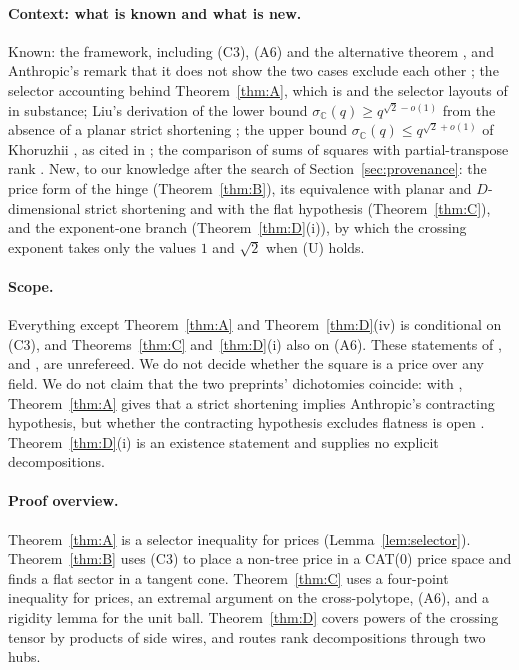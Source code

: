 \documentclass[11pt,a4paper]{article}
\theoremstyle{definition}
\newcommand{\C}{\mathbb{C}}
\newcommand{\CS}{\textup{C3}}
\newcommand{\AS}{\textup{A6}}
\begin{document}
\paragraph{Context: what is known and what is new.} Known: the framework,
including (\CS), (\AS) and the alternative theorem \cite[Thm.~D.2]{Ant}, and
Anthropic's remark that it does not show the two cases exclude each other
\cite[\S D.3]{Ant}; the selector accounting behind Theorem~\ref{thm:A}, which is
\cite[Lemma~E.7]{Ant} and the selector layouts of \cite[\S2]{OAI} in substance;
Liu's derivation of the lower bound $\sigma_\C(q)\ge q^{\sqrt2-o(1)}$ from the
absence of a planar strict shortening \cite[p.~3, ``Two crossing cuts'']{Liu1};
the upper bound $\sigma_\C(q)\le q^{\sqrt2+o(1)}$ of Khoruzhii \cite{Kh}, as cited
in \cite{Liu1}; the comparison of sums of squares with partial-transpose rank
\cite{RZ}. New, to our knowledge after the search of
Section~\ref{sec:provenance}: the price form of the hinge (Theorem~\ref{thm:B}),
its equivalence with planar and $D$-dimensional strict shortening and with the
flat hypothesis (Theorem~\ref{thm:C}), and the exponent-one branch
(Theorem~\ref{thm:D}(i)), by which the crossing exponent takes only the values
$1$ and $\sqrt2$ when (U) holds.

\paragraph{Scope.} Everything except Theorem~\ref{thm:A} and
Theorem~\ref{thm:D}(iv) is conditional on (\CS), and Theorems~\ref{thm:C}
and~\ref{thm:D}(i) also on (\AS). These statements of \cite{Ant}, and \cite{OAI},
are unrefereed. We do not decide whether the square is a price over any field.
We do not claim that the two preprints' dichotomies coincide: with
\cite[Thm.~D.2]{Ant}, Theorem~\ref{thm:A} gives that a strict shortening implies
Anthropic's contracting hypothesis, but whether the contracting hypothesis
excludes flatness is open \cite[\S D.3]{Ant}. Theorem~\ref{thm:D}(i) is an
existence statement and supplies no explicit decompositions.

\paragraph{Proof overview.} Theorem~\ref{thm:A} is a selector inequality for
prices (Lemma~\ref{lem:selector}). Theorem~\ref{thm:B} uses (\CS) to place a
non-tree price in a CAT(0) price space and finds a flat sector in a tangent cone.
Theorem~\ref{thm:C} uses a four-point inequality for prices, an extremal
argument on the cross-polytope, (\AS), and a rigidity lemma for the unit ball.
Theorem~\ref{thm:D} covers powers of the crossing tensor by products of side
wires, and routes rank decompositions through two hubs.
\end{document}
